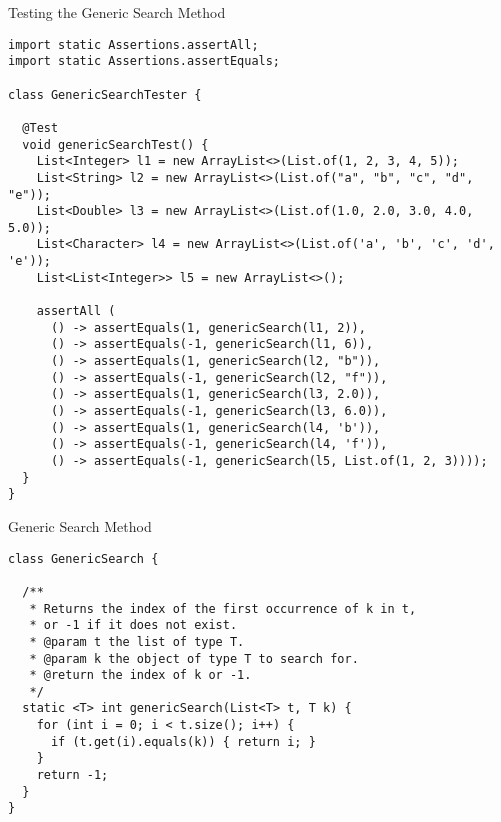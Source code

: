 
\begin{cl}[]{Testing the Generic Search Method}
\begin{lstlisting}[language=MyJava]
import static Assertions.assertAll;
import static Assertions.assertEquals;

class GenericSearchTester {

  @Test 
  void genericSearchTest() {
    List<Integer> l1 = new ArrayList<>(List.of(1, 2, 3, 4, 5));
    List<String> l2 = new ArrayList<>(List.of("a", "b", "c", "d", "e"));
    List<Double> l3 = new ArrayList<>(List.of(1.0, 2.0, 3.0, 4.0, 5.0));
    List<Character> l4 = new ArrayList<>(List.of('a', 'b', 'c', 'd', 'e'));
    List<List<Integer>> l5 = new ArrayList<>();

    assertAll (
      () -> assertEquals(1, genericSearch(l1, 2)),
      () -> assertEquals(-1, genericSearch(l1, 6)),
      () -> assertEquals(1, genericSearch(l2, "b")),
      () -> assertEquals(-1, genericSearch(l2, "f")),
      () -> assertEquals(1, genericSearch(l3, 2.0)),
      () -> assertEquals(-1, genericSearch(l3, 6.0)),
      () -> assertEquals(1, genericSearch(l4, 'b')),
      () -> assertEquals(-1, genericSearch(l4, 'f')),
      () -> assertEquals(-1, genericSearch(l5, List.of(1, 2, 3))));
  }
}
\end{lstlisting}
\end{cl}

\begin{cl}[]{Generic Search Method}
\begin{lstlisting}[language=MyJava]
class GenericSearch {

  /**
   * Returns the index of the first occurrence of k in t, 
   * or -1 if it does not exist.
   * @param t the list of type T.
   * @param k the object of type T to search for.
   * @return the index of k or -1.
   */
  static <T> int genericSearch(List<T> t, T k) {
    for (int i = 0; i < t.size(); i++) {
      if (t.get(i).equals(k)) { return i; }
    }
    return -1;
  }
}
\end{lstlisting}
\end{cl}

